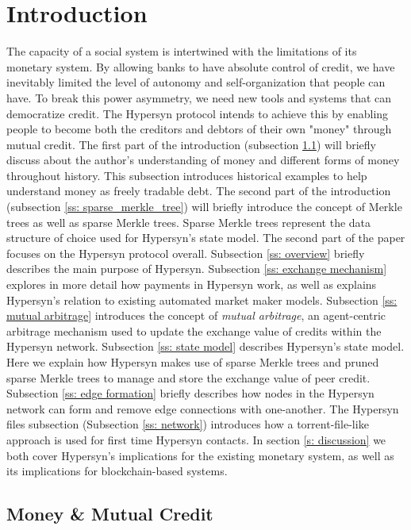 \documentclass{article}
\begin{document}
\section{Introduction}
The capacity of a social system is intertwined with the limitations of its monetary system. By allowing banks to have absolute control of credit, we have inevitably limited the level of autonomy and self-organization that people can have. To break this power asymmetry, we need new tools and systems that can democratize credit. The Hypersyn protocol intends to achieve this by enabling people to become both the creditors and debtors of their own "money" through mutual credit. The first part of the introduction (subsection \ref{ss:self_issued_credit}) will briefly discuss about the author's understanding of money and different forms of money throughout history. This subsection introduces historical examples to help understand money as freely tradable debt. The second part of the introduction (subsection \ref{ss: sparse_merkle_tree}) will briefly introduce the concept of Merkle trees as well as sparse Merkle trees. Sparse Merkle trees represent the data structure of choice used for Hypersyn's state model. The second part of the paper focuses on the Hypersyn protocol overall. Subsection \ref{ss: overview} briefly describes the main purpose of Hypersyn. Subsection \ref{ss: exchange mechanism} explores in more detail how payments in Hypersyn work, as well as explains Hypersyn's relation to existing automated market maker models. Subsection \ref{ss: mutual arbitrage} introduces the concept of \textit{mutual arbitrage}, an agent-centric arbitrage mechanism used to update the exchange value of credits within the Hypersyn network. Subsection \ref{ss: state model} describes Hypersyn's state model. Here we explain how Hypersyn makes use of sparse Merkle trees and pruned sparse Merkle trees to manage and store the exchange value of peer credit. Subsection \ref{ss: edge formation} briefly describes how nodes in the Hypersyn network can form and remove edge connections with one-another. The Hypersyn files subsection (Subsection \ref{ss: network}) introduces how a torrent-file-like approach is used for first time Hypersyn contacts. In section \ref{s: discussion} we both cover Hypersyn's implications for the existing monetary system, as well as its implications for blockchain-based systems.

\subsection{Money \& Mutual Credit}
\label{ss:self_issued_credit}
\end{document}
